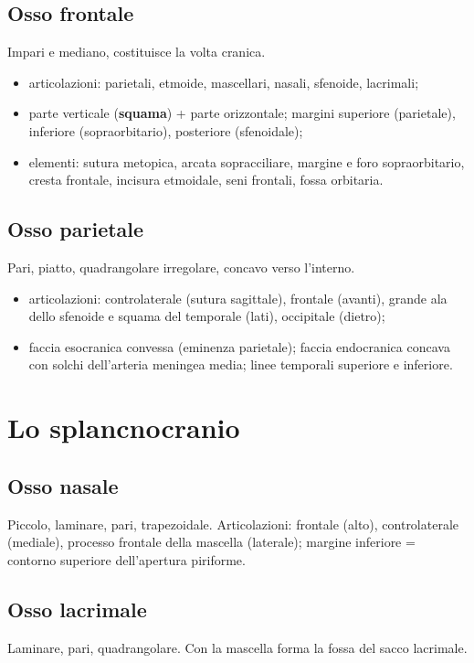 \subsection{Osso frontale}
Impari e mediano, costituisce la volta cranica.
\begin{itemize}
  \item articolazioni: parietali, etmoide, mascellari, nasali, sfenoide, lacrimali;
  \item parte verticale (\textbf{squama}) + parte orizzontale; margini superiore (parietale),
    inferiore (sopraorbitario), posteriore (sfenoidale);
  \item elementi: sutura metopica, arcata sopracciliare, margine e foro sopraorbitario, cresta
    frontale, incisura etmoidale, seni frontali, fossa orbitaria.
\end{itemize}

\subsection{Osso parietale}
Pari, piatto, quadrangolare irregolare, concavo verso l'interno.
\begin{itemize}
  \item articolazioni: controlaterale (sutura sagittale), frontale (avanti), grande ala dello
    sfenoide e squama del temporale (lati), occipitale (dietro);
  \item faccia esocranica convessa (eminenza parietale); faccia endocranica concava con solchi
    dell'arteria meningea media; linee temporali superiore e inferiore.
\end{itemize}

\section{Lo splancnocranio}

\subsection{Osso nasale}
Piccolo, laminare, pari, trapezoidale. Articolazioni: frontale (alto), controlaterale (mediale),
processo frontale della mascella (laterale); margine inferiore = contorno superiore dell'apertura
piriforme.

\subsection{Osso lacrimale}
Laminare, pari, quadrangolare. Con la mascella forma la fossa del sacco lacrimale.

